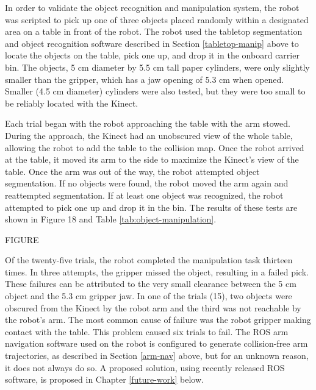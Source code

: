 \documentclass[]{cwru} %
\begin{document}
In order to validate the object recognition and manipulation system, the
robot was scripted to pick up one of three objects placed randomly
within a designated area on a table in front of the robot. The robot
used the tabletop segmentation and object recognition software described
in Section \ref{tabletop-manip} above to locate the objects on the table, pick one up,
and drop it in the onboard carrier bin. The objects, 5 cm diameter by
5.5 cm tall paper cylinders, were only slightly smaller than the
gripper, which has a jaw opening of 5.3 cm when opened. Smaller (4.5 cm
diameter) cylinders were also tested, but they were too small to be
reliably located with the Kinect.

Each trial began with the robot approaching the table with the arm
stowed. During the approach, the Kinect had an unobscured view of the
whole table, allowing the robot to add the table to the collision map.
Once the robot arrived at the table, it moved its arm to the side to
maximize the Kinect's view of the table. Once the arm was out of the
way, the robot attempted object segmentation. If no objects were found,
the robot moved the arm again and reattempted segmentation. If at least
one object was recognized, the robot attempted to pick one up and drop
it in the bin. The results of these tests are shown in Figure 18 and
Table \ref{tab:object-manipulation}.

FIGURE

Of the twenty-five trials, the robot completed the manipulation task
thirteen times. In three attempts, the gripper missed the object,
resulting in a failed pick. These failures can be attributed to the very
small clearance between the 5 cm object and the 5.3 cm gripper jaw. In
one of the trials (15), two objects were obscured from the Kinect by the
robot arm and the third was not reachable by the robot's arm. The most
common cause of failure was the robot gripper making contact with the
table. This problem caused six trials to fail. The ROS arm navigation
software used on the robot is configured to generate collision-free arm
trajectories, as described in Section \ref{arm-nav} above, but for an unknown
reason, it does not always do so. A proposed solution, using recently
released ROS software, is proposed in Chapter \ref{future-work} below.
\end{document}
